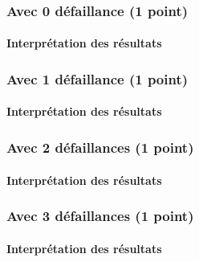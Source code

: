\documentclass[a4paper]{book}
\begin{document}
\subsubsection{Avec 0 défaillance (1 point)}





\paragraph{Interprétation des résultats}

\subsubsection{Avec 1 défaillance (1 point)}





\paragraph{Interprétation des résultats}

\subsubsection{Avec 2 défaillances (1 point)}





\paragraph{Interprétation des résultats}

\subsubsection{Avec 3 défaillances (1 point)}





\paragraph{Interprétation des résultats}
\end{document}
